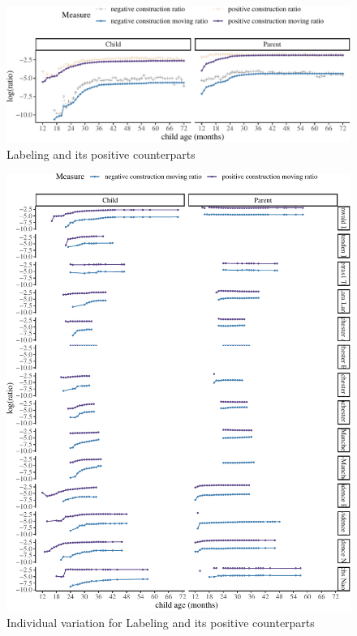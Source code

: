 \documentclass[
  english,
  man,floatsintext]{apa6}
\begin{document}
\begin{figure}[H]

{\centering \includegraphics{neg_construction_article_files/figure-latex/learning-1} 

}

\caption{Labeling and its positive counterparts}\label{fig:learning}
\end{figure}

\begin{figure}[H]

{\centering \includegraphics{neg_construction_article_files/figure-latex/individuallearning-1} 

}

\caption{Individual variation for Labeling and its positive counterparts}\label{fig:individuallearning}
\end{figure}
\end{document}
